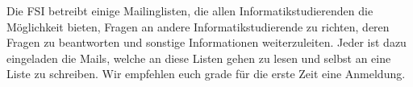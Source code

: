 
Die FSI betreibt einige Mailinglisten, die allen Informatikstudierenden die Möglichkeit bieten, Fragen an andere Informatikstudierende zu richten, deren Fragen zu beantworten und sonstige Informationen weiterzuleiten.  Jeder ist dazu eingeladen die Mails, welche an diese Listen gehen zu lesen und selbst an eine Liste zu schreiben. Wir empfehlen euch grade für die erste Zeit eine Anmeldung.

\newcommand{\mladressen}[1]{
    Anmelden: Leere Mail an {\footnotesize \email{#1-subscribe@fsi.uni-tuebingen.de}} \\
    Abmelden: Leere Mail an {\footnotesize \email{#1-unsubscribe@fsi.uni-tuebingen.de}} \\
    Hilfetext: Mail mit Betreff \emph{help} an {\footnotesize \email{#1-request@fsi.uni-tuebingen.de}}}

